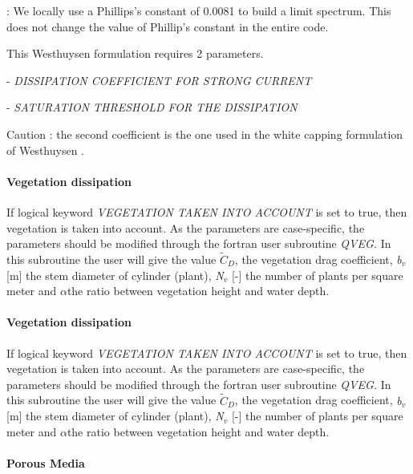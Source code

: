  \textbf{} : We locally use a Phillips's constant of 0.0081 to build a limit spectrum. This does not change the value of Phillip's constant in the entire code.  

 \textbf{}

 This Westhuysen formulation requires 2 parameters.

 - \textit{DISSIPATION COEFFICIENT FOR STRONG CURRENT}

 - \textit{SATURATION THRESHOLD FOR THE DISSIPATION}

 Caution : the second coefficient is the one used in the white capping formulation of Westhuysen \cite{Westhuys2008}.


\paragraph{ Vegetation dissipation}

If logical keyword \textit{VEGETATION TAKEN INTO ACCOUNT} is set to true, then vegetation is taken into account. As the
parameters are case-specific, the parameters should be modified through the fortran user subroutine \textit{QVEG. }In this
subroutine the user will give the value $\tilde{C}_{D} $, the vegetation drag coefficient, \textit{b${}_{v}$} [m] the stem diameter
of cylinder (plant), \textit{N${}_{v}$} [-] the number of plants per square meter and $\alpha $the ratio between vegetation height
and water depth.

\paragraph{ Vegetation dissipation}

If logical keyword \textit{VEGETATION TAKEN INTO ACCOUNT} is set to true, then vegetation is taken into account. As the parameters
are case-specific, the parameters should be modified through the fortran user subroutine \textit{QVEG. }In this subroutine the user
will give the value $\tilde{C}_{D} $, the vegetation drag coefficient, \textit{b${}_{v}$} [m] the stem diameter of cylinder (plant),
\textit{N${}_{v}$} [-] the number of plants per square meter and $\alpha $the ratio between vegetation height and water depth.

\paragraph{Porous Media}

